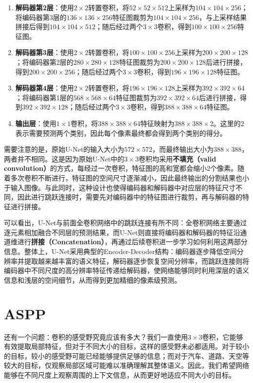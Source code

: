 \begin{enumerate}
    \item \textbf{解码器第2层}：使用$2\times2$转置卷积，将$52\times52\times512$上采样为$104\times104\times256$；将编码器第3层的$136\times136\times256$特征图裁剪为$104\times104\times256$，与上采样结果拼接后得到$104\times104\times512$；随后经过两个$3\times3$卷积，得到$100\times100\times256$特征图。
    \item \textbf{解码器第3层}：使用$2\times2$转置卷积，将$100\times100\times256$上采样为$200\times200\times128$；将编码器第2层的$280\times280\times128$特征图裁剪为$200\times200\times128$后进行拼接，得到$200\times200\times256$；随后经过两个$3\times3$卷积，得到$196\times196\times128$特征图。
    \item \textbf{解码器第4层}：使用$2\times2$转置卷积，将$196\times196\times128$上采样为$392\times392\times64$；将编码器第1层的$568\times568\times64$特征图裁剪为$392\times392\times64$后进行拼接，得到$392\times392\times128$；随后经过两个$3\times3$卷积，得到$388\times388\times64$特征图。
    \item \textbf{输出层}：使用$1\times1$卷积，将$388\times388\times64$特征映射为$388\times388\times2$。这里的$2$表示需要预测两个类别，因此每个像素最终都会得到两个类别的得分。
\end{enumerate}

需要注意的是，原始U-Net的输入大小为$572\times572$，而最终输出大小为$388\times388$，两者并不相同。这是因为原始U-Net中的$3\times3$卷积均采用\textbf{不填充（valid convolution）}的方式，每经过一次卷积，特征图的高和宽都会缩小$2$个像素。随着多次卷积不断进行，特征图的空间尺寸逐渐减小，因此最终输出的分割结果也小于输入图像。与此同时，这种设计也使得编码器和解码器中对应层的特征尺寸不同，因此进行跳跃连接时，需要先对编码器中的特征图进行裁剪，再与解码器的特征进行拼接。

可以看出，U-Net与前面全卷积网络中的跳跃连接有所不同：全卷积网络主要通过逐元素相加融合不同层的预测结果，而U-Net则直接将编码器和解码器的特征沿通道维进行\textbf{拼接（Concatenation）}，再通过后续卷积进一步学习如何利用这两部分信息。整体上，U-Net采用典型的Encoder-Decoder结构：编码器逐步降低空间分辨率并提取越来越丰富的语义特征，解码器逐步恢复空间分辨率，而跳跃连接则将编码器中不同尺度的高分辨率特征传递给解码器，使网络能够同时利用深层的语义信息和浅层的空间细节，从而得到更加精细的像素级预测。

\section{ASPP}

还有一个问题：卷积的感受野究竟应该有多大？我们一直使用$3\times3$卷积，它能够有效提取局部特征，但对于不同大小的目标，这样的感受野未必都适用。对于较小的目标，较小的感受野可能已经能够提供足够的信息；而对于汽车、道路、天空等较大的目标，仅观察局部区域可能难以准确理解其整体语义。因此，我们希望网络能够在不同尺度上观察周围的上下文信息，从而更好地适应不同大小的目标。

